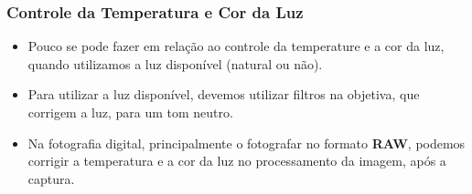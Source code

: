 



\begin{frame}
    \frametitle{Controle da Temperatura e Cor da Luz}
    \begin{itemize}
      \item Pouco se pode fazer em relação ao controle da temperature e a cor da luz,
      quando utilizamos a luz disponível (natural ou não).
      \item Para utilizar a luz disponível, devemos utilizar filtros na objetiva,
      que corrigem a luz, para um tom neutro.
      \item Na fotografia digital, principalmente o fotografar no formato \textbf{RAW}, podemos
      corrigir a temperatura e a cor da luz no processamento da imagem, após a captura.
    \end{itemize}
\end{frame}




